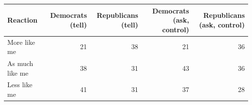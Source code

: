 
\begin{tabular}{lrrrr}
\toprule
Reaction & Democrats (tell) & Republicans (tell) & Democrats (ask, control) & Republicans (ask, control)\\
\midrule
More like me & 21 & 38 & 21 & 36\\
As much like me & 38 & 31 & 43 & 36\\
Less like me & 41 & 31 & 37 & 28\\
\bottomrule
\end{tabular}
